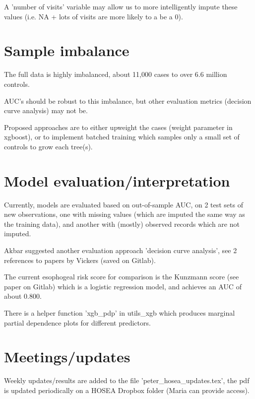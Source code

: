 \documentclass[12pt]{article}
\begin{document}
A 'number of visits' variable may allow us to more intelligently impute these values (i.e. NA + lots of visits are more likely to a be a 0).

\section*{Sample imbalance}

The full data is highly imbalanced, about 11,000 cases to over 6.6 million controls.

AUC's should be robust to this imbalance, but other evaluation metrics (decision curve analysis) may not be.

Proposed approaches are to either upweight the cases (weight parameter in xgboost), or to implement batched training which samples only a small set of controls to grow each tree(s).

\section*{Model evaluation/interpretation}

Currently, models are evaluated based on out-of-sample AUC, on 2 test sets of new observations, one with missing values (which are imputed the same way as the training data), and another with (mostly) observed records which are not imputed.

Akbar suggested another evaluation approach 'decision curve analysis', see 2 references to papers by Vickers (saved on Gitlab).

The current esophogeal risk score for comparison is the Kunzmann score (see paper on Gitlab) which is a logistic regression model, and achieves an AUC of about 0.800.

There is a helper function 'xgb\_pdp' in utils\_xgb which produces marginal partial dependence plots for different predictors.

\section*{Meetings/updates}

Weekly updates/results are added to the file 'peter\_hosea\_updates.tex', the pdf is updated periodically on a HOSEA Dropbox folder (Maria can provide access).

%
\end{document}
